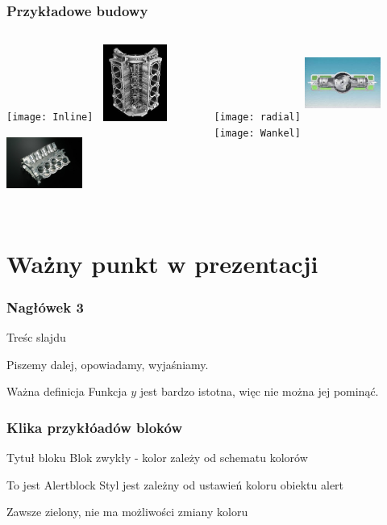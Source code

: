 \documentclass{beamer}
\begin{document}
	\begin{frame}
	
	\frametitle{Przykładowe budowy}
		\begin{columns}
			\begin{column}{0.5\textwidth}
				\pause \texttt{[image: Inline]}
				\pause \includegraphics[width=2.5cm,height=2.5cm]{V}
				\pause\includegraphics[width=2.5cm,height=2.5cm]{W}
			\end{column}
			
			\begin{column}{0.5\textwidth}
				\pause\texttt{[image: radial]}
				\pause\includegraphics[width=2.5cm,height=2.5cm]{boxer}
				\pause\texttt{[image: Wankel]}
			\end{column}
		\end{columns}
	\end{frame}
	
\section{Ważny punkt w prezentacji} 

\begin{frame}
\frametitle{Nagłówek 3}
Treśc slajdu

\pause Piszemy dalej, opowiadamy, wyjaśniamy.

\pause \begin{block} {Ważna definicja}
Funkcja  $y$ jest bardzo istotna, więc nie można jej pominąć.
\end{block}
\end{frame}

\begin{frame}
\frametitle{Klika przykłóadów bloków}
\begin{block}{Tytuł bloku}
Blok zwykły - kolor zależy od schematu kolorów
\end{block}
\begin{alertblock}{To jest Alertblock}
Styl jest zależny od ustawień koloru obiektu \alert{alert}
\end{alertblock}
\begin{examples}
Zawsze zielony, nie ma możliwości zmiany koloru
\end{examples}
\end{frame}
\end{document}
